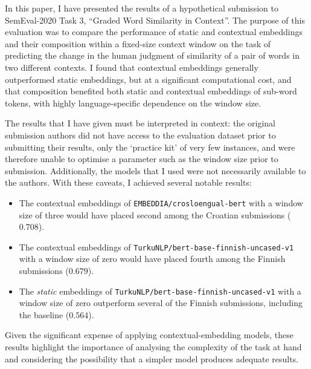In this paper, I have presented the results of a hypothetical submission to SemEval-2020
Task 3, ``Graded Word Similarity in Context''.
The purpose of this evaluation was to compare the performance of static and contextual
embeddings and their composition within a fixed-size context window on the task of
predicting the change in the human judgment of similarity of a pair of words in two
different contexts.
I found that contextual embeddings generally outperformed static embeddings, but at a
significant computational cost, and that composition benefited both static and
contextual embeddings of sub-word tokens, with highly language-specific dependence
on the window size.

The results that I have given must be interpreted in context: the original submission
authors did not have access to the evaluation dataset prior to submitting their results,
only the `practice kit' of very few instances, and were therefore unable to optimise a
parameter such as the window size prior to submission.
Additionally, the models that I used were not necessarily available to the authors.
With these caveats, I achieved several notable results:
\begin{itemize}
  \item The contextual embeddings of \texttt{EMBEDDIA/crosloengual-bert} with a window
        size of three would have placed second among the Croatian submissions
        ($0.708$).
  \item The contextual embeddings of \texttt{TurkuNLP/bert-base-finnish-uncased-v1} with
        a window size of zero would have placed fourth among the Finnish submissions
        ($0.679$).
  \item The \emph{static} embeddings of \texttt{TurkuNLP/bert-base-finnish-uncased-v1}
        with a window size of zero outperform several of the Finnish submissions,
        including the baseline ($0.564$).
\end{itemize}
Given the significant expense of applying contextual-embedding models, these results
highlight the importance of analysing the complexity of the task at hand and considering
the possibility that a simpler model produces adequate results.